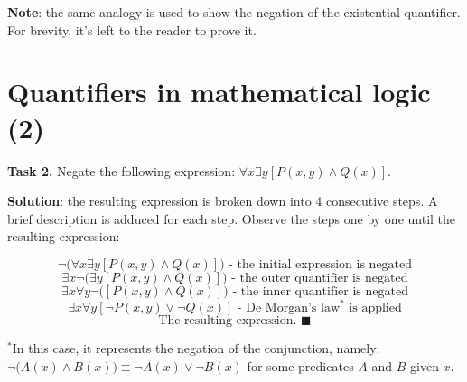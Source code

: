 \documentclass[10pt,a4paper]{article}
\begin{document}
\textbf{Note}: the same analogy is used to show the negation of the existential quantifier. For brevity,
it's left to the reader to prove it.


\section*{Quantifiers in mathematical logic (2)}

\textbf{Task 2.} Negate the following expression: $\forall x \exists y [P(x, y) \land Q(x)]$.

\textbf{Solution}: the resulting expression is broken down into 4 consecutive steps. A brief description is
adduced for each step. Observe the steps one by one until the resulting expression:

\begin{linenomath*}
    \begin{equation}
        \neg \big( \forall x \exists y [P(x, y) \land Q(x)] \big)
        \text{ - the initial expression is negated}
    \end{equation} 
    \begin{equation}
        \exists x \neg \big( \exists y [P(x, y) \land Q(x)] \big)
        \text{ - the outer quantifier is negated}
    \end{equation}
    \begin{equation}
        \exists x \forall y \neg \big( [P(x, y) \land Q(x)] \big)
        \text{ - the inner quantifier is negated}
    \end{equation}
    \begin{equation}
        \exists x \forall y [\neg P(x, y) \lor \neg Q(x)]
        \text{ - De Morgan's law} ^{\ast} \text{ is applied}
    \end{equation}
    \begin{equation}
        \text{The resulting expression. } \blacksquare
    \end{equation}
    
\end{linenomath*}

$^{\ast}$In this case, it represents the negation of the conjunction, 
namely: $\neg \big( A(x) \land B(x) \big) \equiv \neg A(x) \lor \neg B(x)$ 
for some predicates $A$ and $B$ given $x$.
\end{document}
